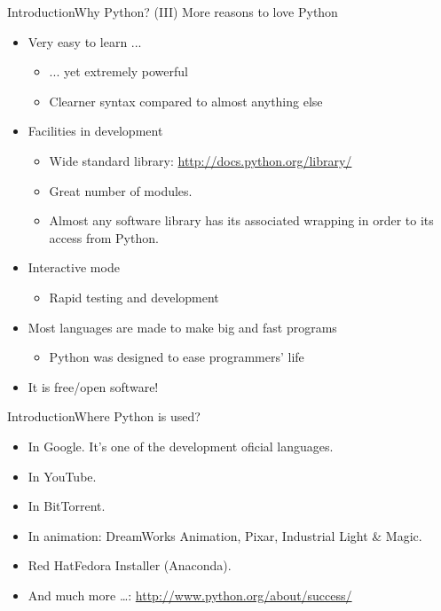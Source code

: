 \documentclass[10pt,compress]{beamer} %
\begin{document}
\begin{frame}{Introduction}{Why Python? (III)}
	More reasons to love Python
	\begin{itemize}
	\item Very easy to learn ...
	\begin{itemize}
		\item ... yet extremely powerful
		\item  Clearner syntax compared to almost anything else
	\end{itemize}
	\item Facilities in development
	\begin{itemize}
	\item \small{Wide standard library: \url{http://docs.python.org/library/}}
    \item \small{Great number of modules.}
   \item \small{Almost any software library has its associated wrapping in order to its access from Python.}
   \end{itemize}
	\item Interactive mode
	\begin{itemize}
		\item Rapid testing and development
	\end{itemize}
	\item Most languages are made to make big and fast programs
	\begin{itemize}
		\item Python was designed to ease programmers' life
	\end{itemize}
	\item It is free/open software!
	\end{itemize}
\end{frame}

\begin{frame}{Introduction}{Where Python is used?}
	
	\begin{itemize}
	\item In Google. It's one of the development oficial languages.
	
	\item In YouTube.
	
	\item In BitTorrent.
	
	\item In animation: DreamWorks Animation, Pixar, Industrial Light \& Magic.
	\item Red Hat\/Fedora Installer  (Anaconda).
	\item And much more \ldots : \url{http://www.python.org/about/success/}
	\end{itemize}
\end{frame}
\end{document}
